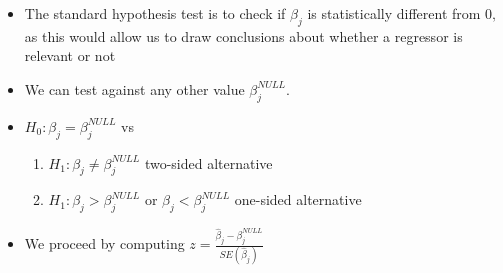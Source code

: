 \documentclass[notes=show]{beamer}
\begin{document}
\begin{frame}%


\begin{itemize}
\item The standard hypothesis test is to check if $\beta _{j}$ is
statistically different from $0,$ as this would allow us to draw conclusions
about whether a regressor is relevant or not

\item We can test against any other value $\beta _{j}^{NULL}.$

\item $H_{0}:\beta _{j}=\beta _{j}^{NULL}$ vs

\begin{enumerate}
\item $H_{1}:\beta _{j}\neq \beta _{j}^{NULL}$ two-sided alternative

\item $H_{1}:\beta _{j}>\beta _{j}^{NULL}$ or $\beta _{j}<\beta _{j}^{NULL}$
one-sided alternative
\end{enumerate}

\item We proceed by computing $z=\frac{\widehat{\beta }_{j}-\beta _{j}^{NULL}%
}{SE(\widehat{\beta }_{j})}$
\end{itemize}

\end{frame}%
\end{document}

